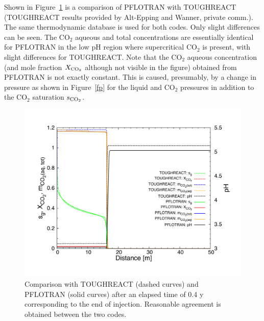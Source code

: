 Shown in Figure~\ref{fco2} is a comparison of PFLOTRAN with TOUGHREACT (TOUGHREACT results provided by Alt-Epping and Wanner, private comm.). The same thermodynamic database is used for both codes. Only slight differences can be seen. The CO$_2$ aqueous and total concentrations are essentially identical for PFLOTRAN in the low pH region where supercritical CO$_2$ is present, with slight differences for TOUGHREACT. Note that the CO$_2$ aqueous concentration (and mole fraction $X_{\rm CO_2}$ although not visible in the figure) obtained from PFLOTRAN is not exactly constant. This is caused, presumably, by a change in pressure as 
shown in Figure~\ref{fp} for the liquid and CO$_2$ pressures in addition to the CO$_2$ saturation $s_{\rm CO_2}$.

\begin{figure}[h]\centering
\includegraphics[width=\textwidth]{./figs/tr-pflotran-brine}

\vspace{-1.cm}

\parbox{5in}{
\caption{Comparison with TOUGHREACT (dashed curves) and PFLOTRAN (solid curves) after an elapsed time of 0.4 y corresponding to the end of injection. Reasonable agreement is obtained between the two codes.}
\label{fco2}}
\end{figure}

